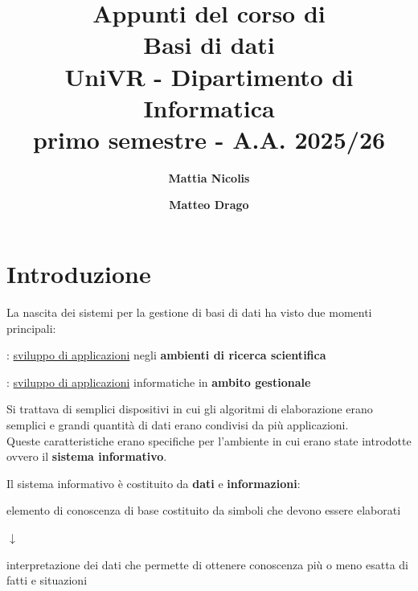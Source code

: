 \documentclass[12pt, a4paper, oneside]{book}
\title{\Huge\bfseries Appunti del corso di \\[0.5ex]
\textcolor{azzurrino}{Basi di dati} \\[1ex]
\Large UniVR - Dipartimento di Informatica \\[1.5ex]
\Large primo semestre - A.A. 2025/26}
\author{\bfseries \Large \textcolor{azzurrino}{Mattia Nicolis} \and \bfseries \Large \textcolor{azzurrino}{Matteo Drago}}
\date{}
\begin{document}
    \frontmatter
    \maketitle
    \tableofcontents
    \thispagestyle{empty}
    \newpage

    \mainmatter

    \chapter{Introduzione}
    La nascita dei sistemi per la gestione di basi di dati ha visto due momenti principali:
    \begin{description}[labelindent=0.5cm]
      \item [anni '60]: \underline{sviluppo di applicazioni} negli \textcolor{azzurrino}{\textbf{ambienti di ricerca scientifica}}
      \item [anni '70]: \underline{sviluppo di applicazioni} informatiche in \textcolor{azzurrino}{\textbf{ambito gestionale}}  
    \end{description}

    Si trattava di semplici dispositivi in cui gli algoritmi di elaborazione erano semplici e grandi quantità di dati erano condivisi da più applicazioni.\\[0.2ex]
    Queste caratteristiche erano specifiche per l'ambiente in cui erano state introdotte ovvero il \textcolor{azzurrino}{\textbf{sistema informativo}}.


    Il sistema informativo è costituito da \textbf{dati} e \textbf{informazioni}:
    \begin{description}
      \centering
      \item [\textcolor{azzurrino}{dato}]
      
      \item elemento di conoscenza di base costituito da simboli che devono essere elaborati
      
      \item $\downarrow$
      
      \item [\textcolor{azzurrino}{informazione}]
      
      \item interpretazione dei dati che permette di ottenere conoscenza più o meno esatta di fatti e situazioni 
    \end{description}
\end{document}
